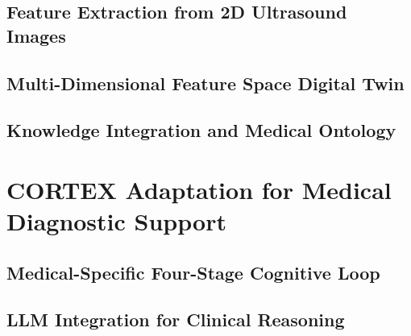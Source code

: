 \subsection{Feature Extraction from 2D Ultrasound Images}

\subsection{Multi-Dimensional Feature Space Digital Twin}

\subsection{Knowledge Integration and Medical Ontology}

\section{CORTEX Adaptation for Medical Diagnostic Support}

\subsection{Medical-Specific Four-Stage Cognitive Loop}

\subsection{LLM Integration for Clinical Reasoning}

